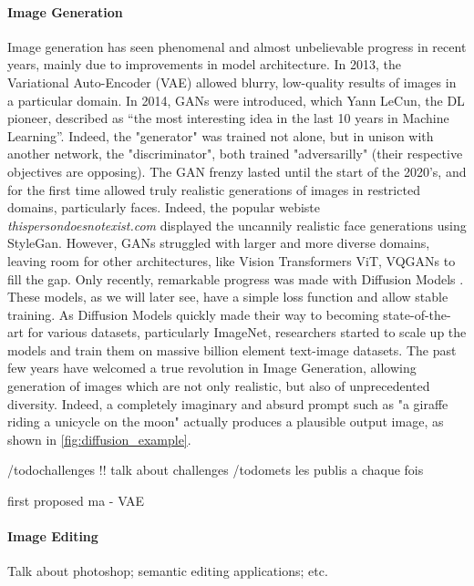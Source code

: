 \paragraph{Image Generation}
Image generation has seen phenomenal and almost unbelievable progress in recent years, mainly due to improvements in model architecture. 
In 2013, the Variational Auto-Encoder (\ac{VAE})  allowed blurry, low-quality results of images in a particular domain. In 2014,
\ac{GAN}s were introduced, which Yann LeCun, the \ac{DL} pioneer, described as “the most interesting idea 
 in the last 10 years in Machine Learning”. Indeed, the "generator" was trained not alone, but in unison with another network, the "discriminator",
 both trained "adversarilly" (their respective objectives are opposing). The \ac{GAN} frenzy lasted until the start of the 2020's, and for the
  first time  allowed truly realistic generations of images in restricted domains, particularly faces. Indeed, the popular webiste
   \emph{thispersondoesnotexist.com} displayed the uncannily realistic face generations using StyleGan. However, \ac{GAN}s struggled with 
   larger and more diverse domains, leaving room for other architectures, like Vision Transformers \ac{ViT, VQGAN}s to fill the gap. Only recently,
   remarkable progress was made with Diffusion Models . These models, as we will later see, have a simple loss function and allow stable training.
   As Diffusion Models quickly made their way to becoming state-of-the-art for various datasets, particularly ImageNet, researchers
   started to scale up the models and train them on massive billion element text-image datasets. The past few years have welcomed
   a true revolution in Image Generation, allowing generation of images which are not only realistic, but also of unprecedented diversity.
   Indeed, a completely imaginary and absurd prompt such as "a giraffe riding a unicycle on the moon" actually produces a  plausible 
   output image, as shown in \ref{fig:diffusion_example}.

   

/todo{challenges !! talk about challenges}
/todo{mets les publis a chaque fois}

 first proposed ma
- VAE 

\paragraph{Image Editing}
Talk about photoshop; semantic editing applications; etc.


